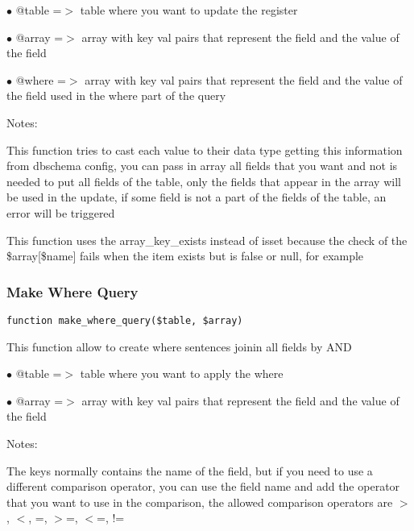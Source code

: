 \documentclass[a4paper]{article}
\begin{document}
\begin{compactitem}
\item[\color{myblue}$\bullet$] @table =$>$ table where you want to update the register
\item[\color{myblue}$\bullet$] @array =$>$ array with key val pairs that represent the field and the value of
          the field
\item[\color{myblue}$\bullet$] @where =$>$ array with key val pairs that represent the field and the value of
          the field used in the where part of the query
\end{compactitem}

Notes:

This function tries to cast each value to their data type getting this
information from dbschema config, you can pass in array all fields that
you want and not is needed to put all fields of the table, only the
fields that appear in the array will be used in the update, if some
field is not a part of the fields of the table, an error will be
triggered

This function uses the array\_key\_exists instead of isset because the
check of the \$array[\$name] fails when the item exists but is false or
null, for example

\hypertarget{toc228}{}
\subsubsection{Make Where Query}

\begin{lstlisting}
function make_where_query($table, $array)
\end{lstlisting}

This function allow to create where sentences joinin all fields by AND

\begin{compactitem}
\item[\color{myblue}$\bullet$] @table =$>$ table where you want to apply the where
\item[\color{myblue}$\bullet$] @array =$>$ array with key val pairs that represent the field and the value of
          the field
\end{compactitem}

Notes:

The keys normally contains the name of the field, but if you need to use
a different comparison operator, you can use the field name and add the
operator that you want to use in the comparison, the allowed comparison
operators are $>$, $<$, =, $>$=, $<$=, !=
\end{document}
